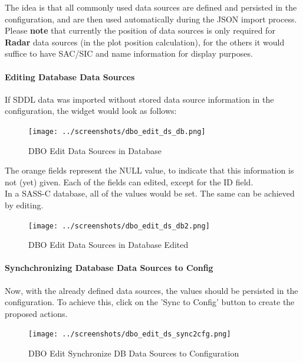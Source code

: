 {The idea is that all commonly used data sources are defined and persisted in the configuration, and are then used automatically during the JSON import process. \\

Please \textbf{note} that currently the position of data sources is only required for \textbf{Radar} data sources (in the plot position calculation), for the others it would suffice to have SAC/SIC and name information for display purposes.

\paragraph{Editing Database Data Sources}

If SDDL data was imported without stored data source information in the configuration, the widget would look as follows:

\begin{figure}[H]
  \hspace*{-1cm}
    \texttt{[image: ../screenshots/dbo\_edit\_ds\_db.png]}
  \caption{DBO Edit Data Sources in Database}
  \label{fig:dbo_edit_ds_db}
\end{figure}

The orange fields represent the NULL value, to indicate that this information is not (yet) given. Each of the fields can edited, except for the ID field. \\

In a SASS-C database, all of the values would be set. The same can be achieved by editing. \\

\begin{figure}[H]
  \hspace*{-2cm}
    \texttt{[image: ../screenshots/dbo\_edit\_ds\_db2.png]}
  \caption{DBO Edit Data Sources in Database Edited}
  \label{fig:dbo_edit_ds_db2}
\end{figure}

\paragraph{Synchchronizing Database Data Sources to Config}

Now, with the already defined data sources, the values should be persisted in the configuration. To achieve this, click on the 'Sync to Config' button to create the proposed actions.

\begin{figure}[H]
  \hspace*{-2cm}
    \texttt{[image: ../screenshots/dbo\_edit\_ds\_sync2cfg.png]}
  \caption{DBO Edit Synchronize DB Data Sources to Configuration }
  \label{fig:dbo_edit_ds_sync2cfg}
\end{figure}

}
